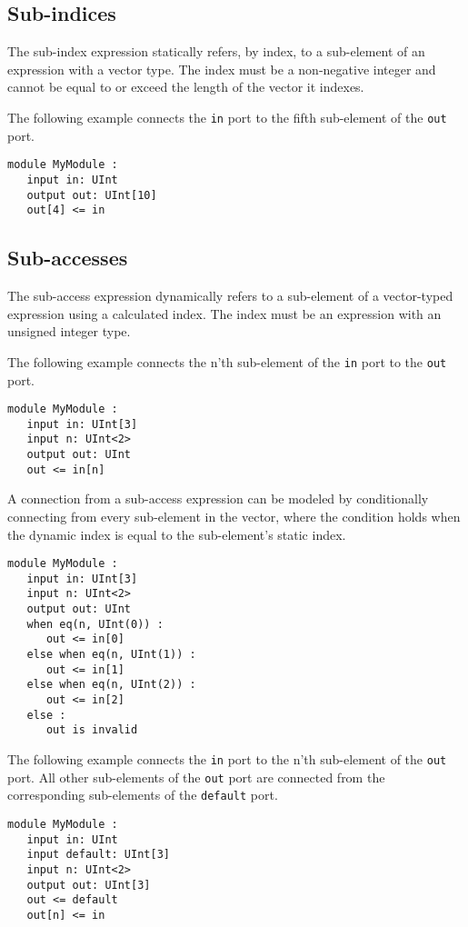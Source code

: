 \documentclass[12pt]{article}
\begin{document}
\subsection{Sub-indices}\label{subindices}
The sub-index expression statically refers, by index, to a sub-element of an expression with a vector type. The index must be a non-negative integer and cannot be equal to or exceed the length of the vector it indexes.

The following example connects the \verb|in| port to the fifth sub-element of the \verb|out| port.
\begin{lstlisting}
module MyModule :
   input in: UInt
   output out: UInt[10]
   out[4] <= in
\end{lstlisting}

\subsection{Sub-accesses}
The sub-access expression dynamically refers to a sub-element of a vector-typed expression using a calculated index. The index must be an expression with an unsigned integer type.

The following example connects the n'th sub-element of the \verb|in| port to the \verb|out| port.
\begin{lstlisting}
module MyModule :
   input in: UInt[3]
   input n: UInt<2>
   output out: UInt
   out <= in[n]
\end{lstlisting}

A connection from a sub-access expression can be modeled by conditionally connecting from every sub-element in the vector, where the condition holds when the dynamic index is equal to the sub-element's static index.
\begin{lstlisting}
module MyModule :
   input in: UInt[3]
   input n: UInt<2>
   output out: UInt
   when eq(n, UInt(0)) :
      out <= in[0]
   else when eq(n, UInt(1)) :
      out <= in[1]
   else when eq(n, UInt(2)) :
      out <= in[2]
   else :
      out is invalid
\end{lstlisting}

The following example connects the \verb|in| port to the n'th sub-element of the \verb|out| port. All other sub-elements of the \verb|out| port are connected from the corresponding sub-elements of the \verb|default| port.
\begin{lstlisting}
module MyModule :
   input in: UInt
   input default: UInt[3]
   input n: UInt<2>
   output out: UInt[3]
   out <= default
   out[n] <= in
\end{lstlisting}
\end{document}
